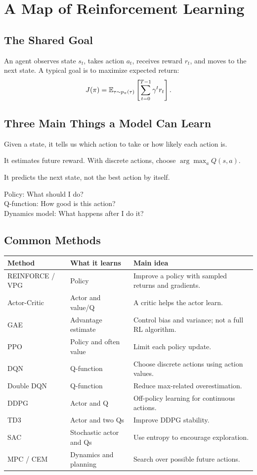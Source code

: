 \chapter{A Map of Reinforcement Learning}
\section{The Shared Goal}
An agent observes state $s_t$, takes action $a_t$, receives reward $r_t$, and moves to the next state. A typical goal is to maximize expected return:
\begin{equation}J(\pi)=\mathbb{E}_{\tau\sim p_\pi(\tau)}\left[\sum_{t=0}^{T-1}\gamma^t r_t\right].\end{equation}
\section{Three Main Things a Model Can Learn}
\begin{description}[style=nextline]
\item[Policy, $\pi_\theta(a\mid s)$] Given a state, it tells us which action to take or how likely each action is.
\item[Value, $V^\pi(s)$ or $Q^\pi(s,a)$] It estimates future reward. With discrete actions, choose $\arg\max_a Q(s,a)$.
\item[Dynamics, $P(s'\mid s,a)$] It predicts the next state, not the best action by itself.
\end{description}
\begin{intuition}
Policy: What should I do?\\
Q-function: How good is this action?\\
Dynamics model: What happens after I do it?
\end{intuition}
\section{Common Methods}
\small
\begin{longtable}{p{}p{}p{}}
\toprule Method & What it learns & Main idea \\\midrule\endhead
REINFORCE / VPG & Policy & Improve a policy with sampled returns and gradients.\\
Actor-Critic & Actor and value/Q & A critic helps the actor learn.\\
GAE & Advantage estimate & Control bias and variance; not a full RL algorithm.\\
PPO & Policy and often value & Limit each policy update.\\
DQN & Q-function & Choose discrete actions using action values.\\
Double DQN & Q-function & Reduce max-related overestimation.\\
DDPG & Actor and Q & Off-policy learning for continuous actions.\\
TD3 & Actor and two Qs & Improve DDPG stability.\\
SAC & Stochastic actor and Qs & Use entropy to encourage exploration.\\
MPC / CEM & Dynamics and planning & Search over possible future actions.\\
\bottomrule
\end{longtable}
\normalsize
